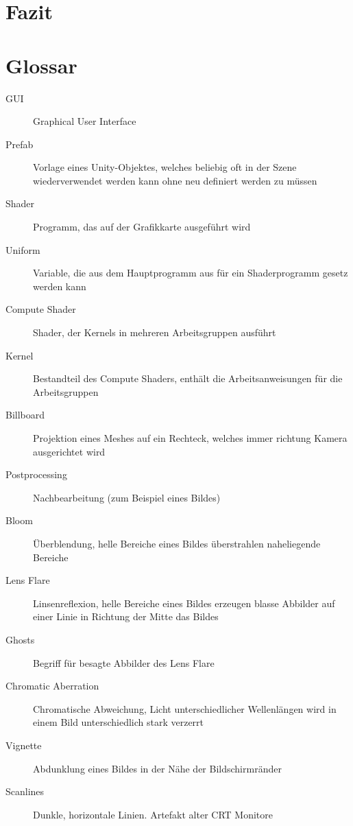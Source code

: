 \documentclass[a4paper,ngerman,12pt]{report}
\begin{document}
\chapter{Fazit}

\lipsum[3]





\chapter{Glossar}

\begin{description}
\item[GUI] Graphical User Interface
\item[Prefab] Vorlage eines Unity-Objektes, welches beliebig oft in der Szene wiederverwendet werden kann ohne neu definiert werden zu müssen
\vspace{5mm}
\item[Shader] Programm, das auf der Grafikkarte ausgeführt wird
\item[Uniform] Variable, die aus dem Hauptprogramm aus für ein Shaderprogramm gesetz werden kann
\item[Compute Shader] Shader, der Kernels in mehreren Arbeitsgruppen ausführt
\item[Kernel] Bestandteil des Compute Shaders, enthält die Arbeitsanweisungen für die Arbeitsgruppen
\item[Billboard] Projektion eines Meshes auf ein Rechteck, welches immer richtung Kamera ausgerichtet wird
\vspace{5mm}
\item[Postprocessing] Nachbearbeitung (zum Beispiel eines Bildes)
\item[Bloom] Überblendung, helle Bereiche eines Bildes überstrahlen naheliegende Bereiche
\item[Lens Flare] Linsenreflexion, helle Bereiche eines Bildes erzeugen blasse Abbilder auf einer Linie in Richtung der Mitte das Bildes
\item[Ghosts] Begriff für besagte Abbilder des Lens Flare
\item[Chromatic Aberration] Chromatische Abweichung, Licht unterschiedlicher Wellenlängen wird in einem Bild unterschiedlich stark verzerrt
\item[Vignette] Abdunklung eines Bildes in der Nähe der Bildschirmränder
\item[Scanlines] Dunkle, horizontale Linien. Artefakt alter CRT Monitore
\end{description}
\end{document}
